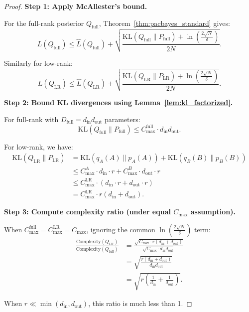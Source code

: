 \documentclass{article}
\theoremstyle{plain}
\theoremstyle{definition}
\theoremstyle{remark}
\begin{document}
\begin{proof}
\textbf{Step 1: Apply McAllester's bound.}

For the full-rank posterior $Q_{\text{full}}$, Theorem~\ref{thm:pacbayes_standard} gives:
\[
L(Q_{\text{full}}) \leq \hat{L}(Q_{\text{full}}) 
+ \sqrt{\frac{\mathrm{KL}(Q_{\text{full}} \| P_{\text{full}}) + \ln\left(\frac{2\sqrt{N}}{\delta}\right)}{2N}}.
\]

Similarly for low-rank:
\[
L(Q_{\text{LR}}) \leq \hat{L}(Q_{\text{LR}}) 
+ \sqrt{\frac{\mathrm{KL}(Q_{\text{LR}} \| P_{\text{LR}}) + \ln\left(\frac{2\sqrt{N}}{\delta}\right)}{2N}}.
\]

\textbf{Step 2: Bound KL divergences using Lemma~\ref{lem:kl_factorized}.}

For full-rank with $D_{\text{full}} = d_{\text{in}}d_{\text{out}}$ parameters:
\[
\mathrm{KL}(Q_{\text{full}} \| P_{\text{full}}) \leq C_{\max}^{\text{full}} \cdot d_{\text{in}}d_{\text{out}}.
\]

For low-rank, we have:
\begin{align*}
\mathrm{KL}(Q_{\text{LR}} \| P_{\text{LR}}) 
&= \mathrm{KL}(q_A(A) \| p_A(A)) + \mathrm{KL}(q_B(B) \| p_B(B)) \\
&\leq C_{\max}^A \cdot d_{\text{in}} \cdot r + C_{\max}^B \cdot d_{\text{out}} \cdot r \\
&\leq C_{\max}^{\text{LR}} \cdot (d_{\text{in}} \cdot r + d_{\text{out}} \cdot r) \\
&= C_{\max}^{\text{LR}} \cdot r(d_{\text{in}} + d_{\text{out}}).
\end{align*}

\textbf{Step 3: Compute complexity ratio (under equal $C_{\max}$ assumption).}

When $C_{\max}^{\text{full}} = C_{\max}^{\text{LR}} = C_{\max}$, ignoring the common $\ln\left(\frac{2\sqrt{N}}{\delta}\right)$ term:
\begin{align*}
\frac{\text{Complexity}(Q_{\text{LR}})}{\text{Complexity}(Q_{\text{full}})} 
&= \frac{\sqrt{C_{\max} \cdot r(d_{\text{in}} + d_{\text{out}})}}{\sqrt{C_{\max} \cdot d_{\text{in}}d_{\text{out}}}} \\
&= \sqrt{\frac{r(d_{\text{in}} + d_{\text{out}})}{d_{\text{in}}d_{\text{out}}}} \\
&= \sqrt{r\left(\frac{1}{d_{\text{in}}} + \frac{1}{d_{\text{out}}}\right)}.
\end{align*}

When $r \ll \min(d_{\text{in}}, d_{\text{out}})$, this ratio is much less than 1.
\end{proof}
\end{document}
